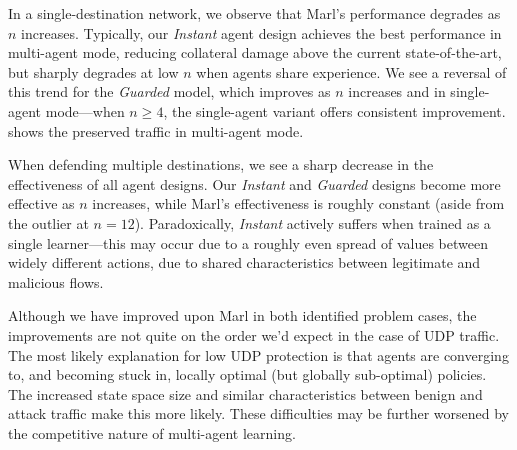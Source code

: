 \documentclass[10pt, times, conference, letterpaper]{IEEEtran}
\begin{document}
%	
%
%	
%
%	

In a single-destination network, we observe that Marl's performance degrades as $n$ increases.
Typically, our \emph{Instant} agent design achieves the best performance in multi-agent mode, reducing collateral damage above the current state-of-the-art, but sharply degrades at low $n$ when agents share experience.
We see a reversal of this trend for the \emph{Guarded} model, which improves as $n$ increases and in single-agent mode---when $n\ge4$, the single-agent variant offers consistent improvement.
 shows the preserved traffic in multi-agent mode.

When defending multiple destinations, we see a sharp decrease in the effectiveness of all agent designs.
Our \emph{Instant} and \emph{Guarded} designs become more effective as $n$ increases, while Marl's effectiveness is roughly constant (aside from the outlier at $n=12$).
Paradoxically, \emph{Instant} actively suffers when trained as a single learner---this may occur due to a roughly even spread of values between widely different actions, due to shared characteristics between legitimate and malicious flows.

Although we have improved upon Marl in both identified problem cases, the improvements are not quite on the order we'd expect in the case of UDP traffic.
The most likely explanation for low UDP protection is that agents are converging to, and becoming stuck in, locally optimal (but globally sub-optimal) policies.
The increased state space size and similar characteristics between benign and attack traffic make this more likely.
These difficulties may be further worsened by the competitive nature of multi-agent learning.
\end{document}
